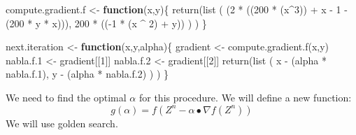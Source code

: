 \documentclass[
]{article}
\newenvironment{Shaded}{\begin{snugshade}}{\end{snugshade}}
\newcommand{\ControlFlowTok}[1]{\textcolor[rgb]{0.13,0.29,0.53}{\textbf{#1}}}
\newcommand{\DecValTok}[1]{\textcolor[rgb]{0.00,0.00,0.81}{#1}}
\newcommand{\FloatTok}[1]{\textcolor[rgb]{0.00,0.00,0.81}{#1}}
\newcommand{\FunctionTok}[1]{\textcolor[rgb]{0.00,0.00,0.00}{#1}}
\newcommand{\NormalTok}[1]{#1}
\newcommand{\OtherTok}[1]{\textcolor[rgb]{0.56,0.35,0.01}{#1}}
\newcommand{\SpecialCharTok}[1]{\textcolor[rgb]{0.00,0.00,0.00}{#1}}
\begin{document}
\begin{Shaded}
\begin{Highlighting}[]
\NormalTok{compute.gradient.f }\OtherTok{\textless{}{-}} \ControlFlowTok{function}\NormalTok{(x,y)\{}
  \FunctionTok{return}\NormalTok{(list}
\NormalTok{         (}
\NormalTok{           (}\DecValTok{2} \SpecialCharTok{*}\NormalTok{ ((}\DecValTok{200} \SpecialCharTok{*}\NormalTok{ (x}\SpecialCharTok{\^{}}\DecValTok{3}\NormalTok{)) }\SpecialCharTok{+}\NormalTok{  x }\SpecialCharTok{{-}} \DecValTok{1} \SpecialCharTok{{-}}\NormalTok{ (}\DecValTok{200} \SpecialCharTok{*}\NormalTok{ y }\SpecialCharTok{*}\NormalTok{ x))),}
           \DecValTok{200} \SpecialCharTok{*}\NormalTok{ ((}\SpecialCharTok{{-}}\DecValTok{1} \SpecialCharTok{*}\NormalTok{ (x }\SpecialCharTok{\^{}} \DecValTok{2}\NormalTok{) }\SpecialCharTok{+}\NormalTok{ y))}
\NormalTok{              )}
\NormalTok{         )}
\NormalTok{\}}

\NormalTok{next.iteration }\OtherTok{\textless{}{-}} \ControlFlowTok{function}\NormalTok{(x,y,alpha)\{}
\NormalTok{  gradient }\OtherTok{\textless{}{-}} \FunctionTok{compute.gradient.f}\NormalTok{(x,y)}
\NormalTok{  nabla.f}\FloatTok{.1} \OtherTok{\textless{}{-}}\NormalTok{ gradient[[}\DecValTok{1}\NormalTok{]]}
\NormalTok{  nabla.f}\FloatTok{.2} \OtherTok{\textless{}{-}}\NormalTok{ gradient[[}\DecValTok{2}\NormalTok{]]}
  \FunctionTok{return}\NormalTok{(list}
\NormalTok{            (}
\NormalTok{              x }\SpecialCharTok{{-}}\NormalTok{ (alpha }\SpecialCharTok{*}\NormalTok{ nabla.f}\FloatTok{.1}\NormalTok{),}
\NormalTok{              y }\SpecialCharTok{{-}}\NormalTok{ (alpha }\SpecialCharTok{*}\NormalTok{ nabla.f}\FloatTok{.2}\NormalTok{)}
\NormalTok{              )}
\NormalTok{         )}
\NormalTok{\}}
\end{Highlighting}
\end{Shaded}

We need to find the optimal \(\alpha\) for this procedure. We will
define a new function: \[
g(\alpha) = f(Z^{n} - \alpha \bullet \nabla f(Z^{n}))
\] We will use golden search.
\end{document}
